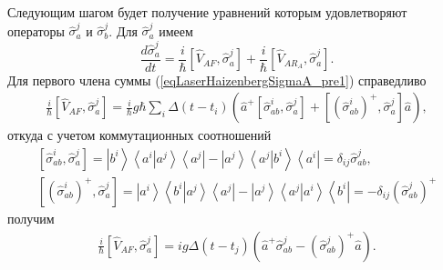 Следующим шагом будет получение уравнений которым удовлетворяют
операторы $\hat{\sigma}_a^j$ и $\hat{\sigma}_b^j$. Для
$\hat{\sigma}_a^j$ имеем
\begin{equation}
\frac{d \hat{\sigma}_a^j}{d t} = 
\frac{i}{\hbar}
\left[\hat{V}_{AF}, \hat{\sigma}_a^j\right] + 
\frac{i}{\hbar}
\left[\hat{V}_{AR_A}, \hat{\sigma}_a^j\right].
\label{eqLaserHaizenbergSigmaA_pre1}
\end{equation}
Для первого члена суммы (\ref{eqLaserHaizenbergSigmaA_pre1}) справедливо
\begin{eqnarray}
\frac{i}{\hbar}
\left[\hat{V}_{AF}, \hat{\sigma}_a^j\right] = 
 \frac{i}{\hbar} g \hbar
\sum_i
\Delta\left(t - t_i\right) 
 \left(
\hat{a}^{+}\left[\hat{\sigma}^{i}_{ab},\hat{\sigma}_a^j\right]  +
\left[\left(\hat{\sigma}^{i}_{ab}\right)^{+},\hat{\sigma}_a^j\right]
\hat{a}
\right),
\nonumber
\end{eqnarray}
откуда с учетом коммутационных соотношений 
\begin{eqnarray}
\left[\hat{\sigma}^{i}_{ab},\hat{\sigma}_a^j\right] = 
\left|b^i\right>\left<a^i\right|\left.a^j\right>\left<a^j\right| -
\left|a^j\right>\left<a^j\right|\left.b^i\right>\left<a^i\right| = 
\delta_{ij}\hat{\sigma}^{j}_{ab},
\nonumber \\
\left[\left(\hat{\sigma}^{i}_{ab}\right)^{+},\hat{\sigma}_a^j\right] = 
\left|a^i\right>\left<b^i\right|\left.a^j\right>\left<a^j\right| -
\left|a^j\right>\left<a^j\right|\left.a^i\right>\left<b^i\right| = 
- \delta_{ij}\left(\hat{\sigma}^{j}_{ab}\right)^{+}
\nonumber
\end{eqnarray}
получим
\begin{eqnarray}
\frac{i}{\hbar}
\left[\hat{V}_{AF}, \hat{\sigma}_a^j\right] = 
i g 
\Delta\left(t - t_j\right) 
 \left(
\hat{a}^{+}\hat{\sigma}^{j}_{ab} -
\left(\hat{\sigma}^{j}_{ab}\right)^{+}\hat{a}
\right).
\label{eqLaserHaizenbergSigmaA_pre1_1}
\end{eqnarray}

